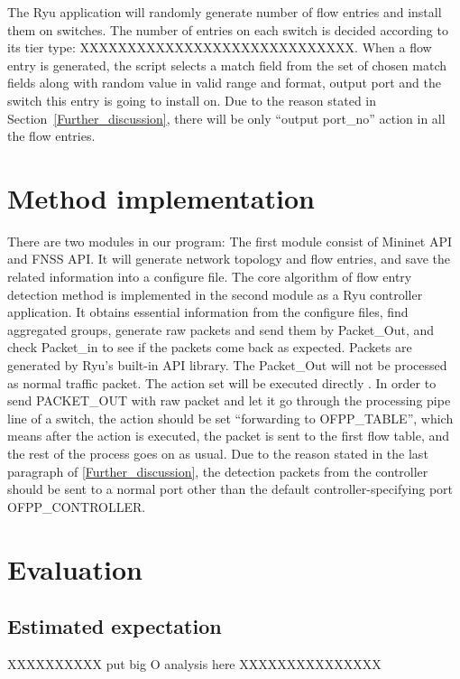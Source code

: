 The Ryu application will randomly generate number of flow entries and install them on switches. The number of entries on each switch is decided according to its tier type: XXXXXXXXXXXXXXXXXXXXXXXXXXXXX.
When a flow entry is generated, the script selects a match field from the set of chosen match fields along with random value in valid range and format, output port and the switch this entry is going to install on. Due to the reason stated in Section~\ref{Further_discussion}, there will be only ``output port\_no'' action in all the flow entries.

\section{Method implementation} 
There are two modules in our program: The first module consist of Mininet API and FNSS API. It will generate network topology and flow entries, and save the related information into a configure file. The core algorithm of flow entry detection method is implemented in the second module as a Ryu controller application. It obtains essential information from the configure files, find aggregated groups, generate raw packets and send them by Packet\_Out, and check Packet\_in to see if the packets come back as expected. Packets are generated by Ryu's built-in API library. The Packet\_Out will not be processed as normal traffic packet. The action set will be executed directly \cite{PACKETOUT}. In order to send PACKET\_OUT with raw packet and let it go through the processing pipe line of a switch, the action should be set ``forwarding to OFPP\_TABLE'', which means after the action is executed, the packet is sent to the first flow table, and the rest of the process goes on as usual. Due to the reason stated in the last paragraph of \ref{Further_discussion}, the detection packets from the controller should be sent to a normal port other than the default controller-specifying port OFPP\_CONTROLLER. 

\section{}

\section{Evaluation}

\subsection{Estimated expectation}
XXXXXXXXXX put big O analysis here XXXXXXXXXXXXXXX

